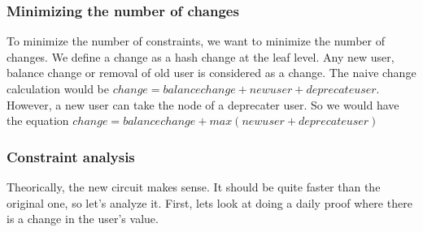 \subsubsection{Minimizing the number of changes}
To minimize the number of constraints, we want to minimize the number of changes.
We define a change as a hash change at the leaf level. Any new user, balance change or removal of old user is considered as a change.
The naive change calculation would be $change = balance change + new user + deprecate user$.
However, a new user can take the node of a deprecater user. So we would have the equation $change = balance change +max(new user + deprecate user)$

\subsubsection{Constraint analysis}
Theorically, the new circuit makes sense. It should be quite faster than the original one, so let's analyze it.
First, lets look at doing a daily proof where there is a change in the user's value.

